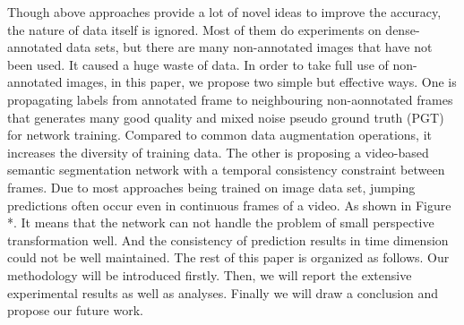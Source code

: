 Though above approaches provide a lot of novel ideas to improve the accuracy, the nature of data itself is ignored. 
%
Most of them do experiments on dense-annotated data sets, but there are many non-annotated images that have not been used.
%
It caused a huge waste of data.
%
In order to take full use of non-annotated images, in this paper, we propose two simple but effective ways. 
%
One is propagating labels from annotated frame to neighbouring non-aonnotated frames that generates many good quality and mixed noise pseudo ground truth (PGT) for network training. 
%
Compared to common data augmentation operations, it increases the diversity of training data.
%
The other is proposing a video-based semantic segmentation network with a temporal consistency constraint between frames. 
%
Due to most approaches being trained on image data set, jumping predictions often occur even in continuous frames of a video. 
%
As shown in Figure *.
%
It means that the network can not handle the problem of small perspective transformation well.
%
And the consistency of prediction results in time dimension could not be well maintained.
%
The rest of this paper is organized as follows.
% 
Our methodology will be introduced firstly.
%
Then, we will report the extensive experimental results as well as analyses. 
%
Finally we will draw a conclusion and propose our future work.
